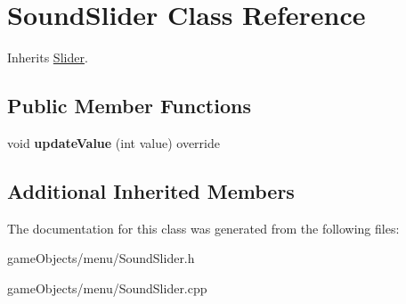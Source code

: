 \hypertarget{class_sound_slider}{\section{Sound\+Slider Class Reference}
\label{class_sound_slider}
}


Inherits \hyperlink{class_slider}{Slider}.

\subsection*{Public Member Functions}
\begin{DoxyCompactItemize}
\item 
\hypertarget{class_sound_slider_ab459445dc7b47e61079a8e6d453909f9}{void {\bfseries update\+Value} (int value) override}\label{class_sound_slider_ab459445dc7b47e61079a8e6d453909f9}

\end{DoxyCompactItemize}
\subsection*{Additional Inherited Members}


The documentation for this class was generated from the following files\+:\begin{DoxyCompactItemize}
\item 
game\+Objects/menu/Sound\+Slider.\+h\item 
game\+Objects/menu/Sound\+Slider.\+cpp\end{DoxyCompactItemize}
